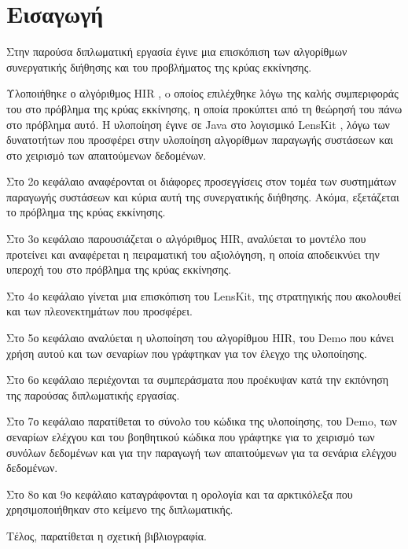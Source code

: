 \chapter[Εισαγωγή]{Εισαγωγή}
\label{Introduction}
Στην παρούσα διπλωματική εργασία έγινε μια επισκόπιση των αλγορίθμων συνεργατικής διήθησης και του προβλήματος της κρύας εκκίνησης. \par
Υλοποιήθηκε ο αλγόριθμος {\en HIR} \cite{Nikolakopoulos2015126}, o οποίος επιλέχθηκε λόγω της καλής συμπεριφοράς του στο πρόβλημα της κρύας εκκίνησης, η οποία προκύπτει από τη θεώρησή του πάνω στο πρόβλημα αυτό. Η υλοποίηση έγινε σε {\en Java} στο λογισμικό {\en LensKit} \cite{Ekstrand:2011:RRR:2043932.2043958}, λόγω των δυνατοτήτων που προσφέρει στην υλοποίηση αλγορίθμων παραγωγής συστάσεων και στο χειρισμό των απαιτούμενων δεδομένων. \par
Στο 2ο κεφάλαιο αναφέρονται οι διάφορες προσεγγίσεις στον τομέα των συστημάτων παραγωγής συστάσεων και κύρια αυτή της συνεργατικής διήθησης. Ακόμα, εξετάζεται το πρόβλημα της κρύας εκκίνησης.\par 
Στο 3ο κεφάλαιο παρουσιάζεται ο αλγόριθμος {\en HIR}, αναλύεται το μοντέλο που προτείνει και αναφέρεται η πειραματική του αξιολόγηση, η οποία αποδεικνύει την υπεροχή του στο πρόβλημα της κρύας εκκίνησης. \par
Στο 4ο κεφάλαιο γίνεται μια επισκόπιση του {\en LensKit}, της στρατηγικής που ακολουθεί και των πλεονεκτημάτων που προσφέρει. \par
Στο 5ο κεφάλαιο αναλύεται η υλοποίηση του αλγορίθμου {\en HIR}, του {\en Demo} που κάνει χρήση αυτού και των σεναρίων που γράφτηκαν για τον έλεγχο της υλοποίησης. \par
Στο 6ο κεφάλαιο περιέχονται τα συμπεράσματα που προέκυψαν κατά την εκπόνηση της παρούσας 
διπλωματικής εργασίας. \par
Στο 7ο κεφάλαιο παρατίθεται το σύνολο του κώδικα της υλοποίησης, του {\en Demo}, των σεναρίων ελέχγου και του βοηθητικού κώδικα που γράφτηκε για το χειρισμό των συνόλων δεδομένων και για την παραγωγή των απαιτούμενων για τα σενάρια ελέγχου δεδομένων. \par
Στο 8ο και 9ο κεφάλαιο καταγράφονται η ορολογία και τα αρκτικόλεξα που χρησιμοποιήθηκαν στο κείμενο της διπλωματικής. \par
Τέλος, παρατίθεται η σχετική βιβλιογραφία. 